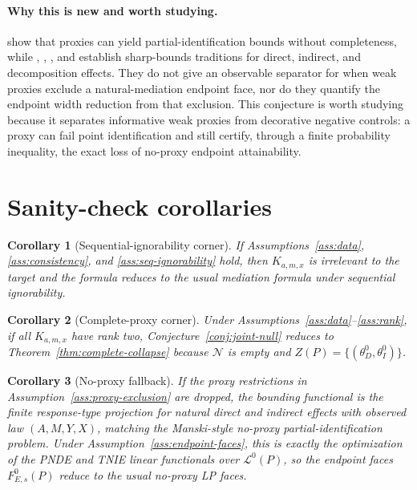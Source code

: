 \documentclass[11pt]{article}
\theoremstyle{definition}
\theoremstyle{plain}
\newtheorem{corollary}{Corollary}
\theoremstyle{remark}
\begin{document}
\paragraph{Why this is new and worth studying.}
\citet{GhassamiShpitserTchetgen2023} show that proxies can yield partial-identification bounds without completeness, while \citet{CaiKurokiPearlTian2008}, \citet{LuoGeng2016}, \citet{MilesKankiMeloniTchetgen2017}, and \citet{GabrielSachsSjolander2023} establish sharp-bounds traditions for direct, indirect, and decomposition effects.  They do not give an observable separator for when weak proxies exclude a natural-mediation endpoint face, nor do they quantify the endpoint width reduction from that exclusion.  This conjecture is worth studying because it separates informative weak proxies from decorative negative controls: a proxy can fail point identification and still certify, through a finite probability inequality, the exact loss of no-proxy endpoint attainability.

\section{Sanity-check corollaries}
\begin{corollary}[Sequential-ignorability corner]\label{cor:ignorability}
If Assumptions~\ref{ass:data}, \ref{ass:consistency}, and \ref{ass:seq-ignorability} hold, then \(K_{a,m,x}\) is irrelevant to the target and the formula reduces to the usual mediation formula under sequential ignorability.
\end{corollary}

\begin{corollary}[Complete-proxy corner]\label{cor:complete}
Under Assumptions~\ref{ass:data}--\ref{ass:rank}, if all \(K_{a,m,x}\) have rank two, Conjecture~\ref{conj:joint-null} reduces to Theorem~\ref{thm:complete-collapse} because \(\mathcal N\) is empty and \(Z(P)=\{(\theta^0_D,\theta^0_I)\}\).
\end{corollary}

\begin{corollary}[No-proxy fallback]\label{cor:noproxy}
If the proxy restrictions in Assumption~\ref{ass:proxy-exclusion} are dropped, the bounding functional is the finite response-type projection for natural direct and indirect effects with observed law \((A,M,Y,X)\), matching the Manski-style no-proxy partial-identification problem.  Under Assumption~\ref{ass:endpoint-faces}, this is exactly the optimization of the PNDE and TNIE linear functionals over \(\mathcal L^0(P)\), so the endpoint faces \(F^0_{E,s}(P)\) reduce to the usual no-proxy LP faces.
\end{corollary}
\end{document}
